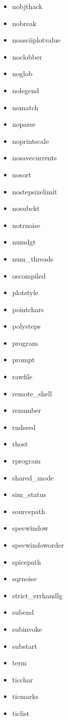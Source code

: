 {\begin{multicols}{3}
\begin{itemize}[leftmargin=0pt,label={}]
    \item nobjthack
    \item nobreak
    \item noasciiplotvalue
    \item noclobber
    \item noglob
    \item nolegend
    \item nomatch
    \item noparse
    \item noprintscale
    \item nosavecurrents
    \item nosort
    \item nostepsizelimit
    \item nosubckt
    \item notrnoise
    \item numdgt
    \item num\_threads
    \item oscompiled
    \item plotstyle
    \item pointchars
    \item polysteps
    \item program
    \item prompt
    \item rawfile
    \item remote\_shell
    \item renumber
    \item rndseed
    \item rhost
    \item rprogram
    \item shared\_mode
    \item sim\_status
    \item sourcepath
    \item specwindow
    \item specwindoworder
    \item spicepath
    \item sqrnoise
    \item strict\_err\textquotesingle handl\textquotesingle g
    \item subend
    \item subinvoke
    \item substart
    \item term
    \item ticchar
    \item ticmarks
    \item ticlist

\end{itemize}
\end{multicols}}
